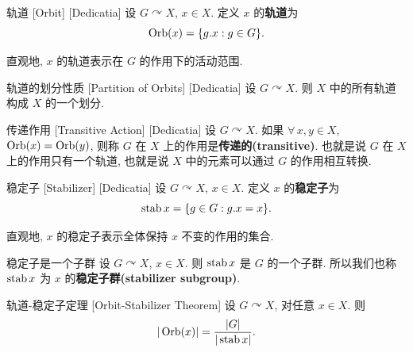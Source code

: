         \begin{dfn}
            [Orbit]
            {轨道}
            [Orbit]
            [Dedicatia]
            设 \(G \curvearrowright X\), \(x \in X\). 定义 \(x\) 的\textbf{轨道}为
            \[\operatorname{Orb}(x)=\{g.x: g\in G\}.\]
        \end{dfn}

        \begin{rmk}
            直观地, \(x\) 的轨道表示在 \(G\) 的作用下的活动范围. 
        \end{rmk}

        \begin{ppt}
            {轨道的划分性质}
            [Partition of Orbits]
            [Dedicatia]
            设 \(G \curvearrowright X\). 则 \(X\) 中的所有轨道构成 \(X\) 的一个划分.
        \end{ppt}

        \begin{dfn}
            {传递作用}
            [Transitive Action]
            [Dedicatia]
            设 \(G \curvearrowright X\). 如果 \(\forall\,x,y\in X\), \(\operatorname{Orb}(x)=\operatorname{Orb}(y)\), 则称 \(G\) 在 \(X\) 上的作用是\textbf{传递的(transitive)}. 也就是说 \(G\) 在 \(X\) 上的作用只有一个轨道, 也就是说 \(X\) 中的元素可以通过 \(G\) 的作用相互转换.
        \end{dfn}

        \begin{dfn}
            [Stabilizer]
            {稳定子}
            [Stabilizer]
            [Dedicatia]
            设 \(G \curvearrowright X\), \(x\in X\). 定义 \(x\) 的\textbf{稳定子}为
            \[\operatorname{stab} x=\{g\in G: g.x=x\}.\]
        \end{dfn}

        \begin{rmk}
            直观地, \(x\) 的稳定子表示全体保持 \(x\) 不变的作用的集合.
        \end{rmk}

        \begin{ppt}
            {稳定子是一个子群}
            设 \(G \curvearrowright X\), \(x\in X\). 则 \(\operatorname{stab} x\) 是 \(G\) 的一个子群. 所以我们也称 \(\operatorname{stab} x\) 为 \(x\) 的\textbf{稳定子群(stabilizer subgroup)}.
        \end{ppt}

        \begin{thm}
            {轨道-稳定子定理}
            [Orbit-Stabilizer Theorem]
            设 \(G \curvearrowright X\), 对任意 \(x\in X\). 则
            \[|\operatorname{Orb}(x)|=\frac{|G|}{|\operatorname{stab} x|}.\]
        \end{thm}

